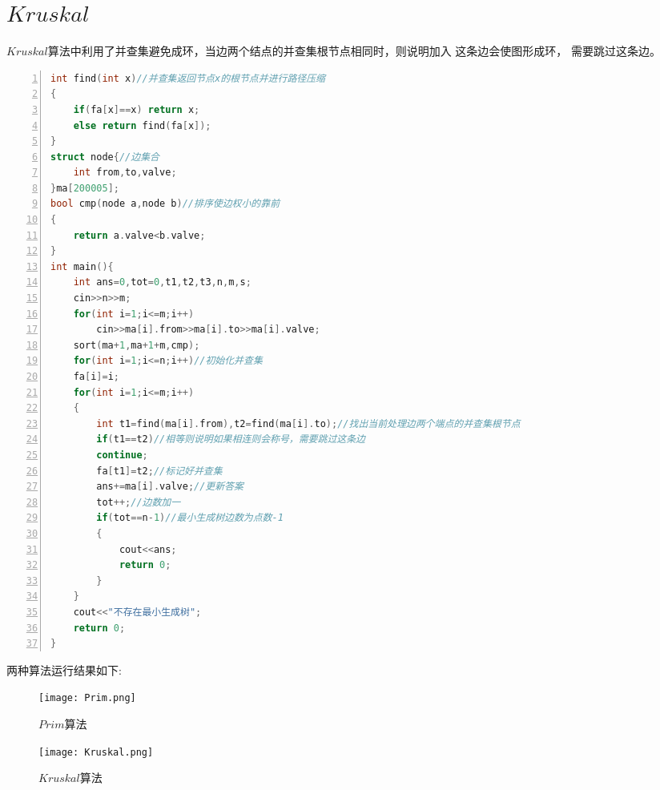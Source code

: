 \documentclass{article}
\begin{document}
\section{$Kruskal$}
$Kruskal$算法中利用了并查集避免成环，当边两个结点的并查集根节点相同时，则说明加入
这条边会使图形成环，
需要跳过这条边。
    \begin{lstlisting}[language=C++,numbers=left,breaklines=true]
int find(int x)//并查集返回节点x的根节点并进行路径压缩
{
    if(fa[x]==x) return x;
    else return find(fa[x]);
}
struct node{//边集合
    int from,to,valve;
}ma[200005];
bool cmp(node a,node b)//排序使边权小的靠前
{
    return a.valve<b.valve;
}
int main(){
    int ans=0,tot=0,t1,t2,t3,n,m,s;
    cin>>n>>m;
    for(int i=1;i<=m;i++)
        cin>>ma[i].from>>ma[i].to>>ma[i].valve;
    sort(ma+1,ma+1+m,cmp);
    for(int i=1;i<=n;i++)//初始化并查集
    fa[i]=i;
    for(int i=1;i<=m;i++)
    {
        int t1=find(ma[i].from),t2=find(ma[i].to);//找出当前处理边两个端点的并查集根节点
        if(t1==t2)//相等则说明如果相连则会称号，需要跳过这条边
        continue;
        fa[t1]=t2;//标记好并查集
        ans+=ma[i].valve;//更新答案
        tot++;//边数加一
        if(tot==n-1)//最小生成树边数为点数-1
        {
            cout<<ans;
            return 0;
        }
    }
    cout<<"不存在最小生成树";	
    return 0;
}
        \end{lstlisting}
        两种算法运行结果如下:
        \begin{figure}[htbp]
            \begin{minipage}[t]{0.45\linewidth}
            \centering
            \texttt{[image: Prim.png]}
            \caption{$Prim$算法}
            \end{minipage}%
            \begin{minipage}[t]{0.45\linewidth}
            \centering
            \texttt{[image: Kruskal.png]}
            \caption{$Kruskal$算法}
            \end{minipage}
            \end{figure}
        
\end{document}
